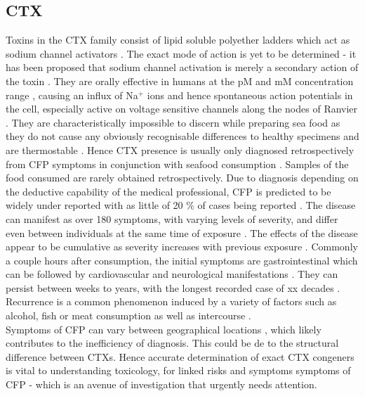 \documentclass[12pt]{article}
\begin{document}
\subsection{CTX}
Toxins in the CTX family consist of lipid soluble polyether ladders which act as sodium channel activators \cite{}. The exact mode of action is yet to be determined - it has been proposed that sodium channel activation is merely a secondary action of the toxin \cite{}. They are orally effective in humans at the pM and mM concentration range \cite{molgo2000ciguatera}, causing an influx of Na$^{+}$ ions and hence spontaneous action potentials in the cell, especially active on voltage sensitive channels along the nodes of Ranvier \cite{sims1987theoretical,mattei1999neurotoxins,lewis1992action,molgo2000ciguatera}. They are characteristically impossible to discern while preparing sea food as they do not cause any obviously recognisable differences to healthy specimens and are thermostable \cite{withers1982ciguatera}. Hence CTX presence is usually only diagnosed retrospectively from CFP symptoms in conjunction with seafood consumption \cite{}. Samples of the food consumed are rarely obtained retrospectively. Due to diagnosis depending on the deductive capability of the medical professional, CFP is predicted to be widely under reported with as little of 20 \% of cases being reported \cite{}. The disease can manifest as over 180 symptoms, with varying levels of severity, and differ even between individuals at the same time of exposure \cite{}. The effects of the disease appear to be cumulative as severity increases with previous exposure \cite{}. Commonly a couple hours after consumption, the initial symptoms are gastrointestinal which can be followed by cardiovascular and neurological manifestations \cite{sims1987theoretical}. They can persist between weeks to years, with the longest recorded case of xx decades \cite{}. Recurrence is a common phenomenon induced by a variety of factors such as alcohol, fish or meat consumption as well as intercourse \cite{}. \\
Symptoms of CFP can vary between geographical locations \cite{molgo2000ciguatera,dickey2010ciguatera}, which likely contributes to the inefficiency of diagnosis. This could be de to the structural difference between CTXs. Hence accurate determination of exact CTX congeners is vital to understanding toxicology, for linked risks and symptoms symptoms of CFP - which is an avenue of investigation that urgently needs attention.\\
\end{document}
